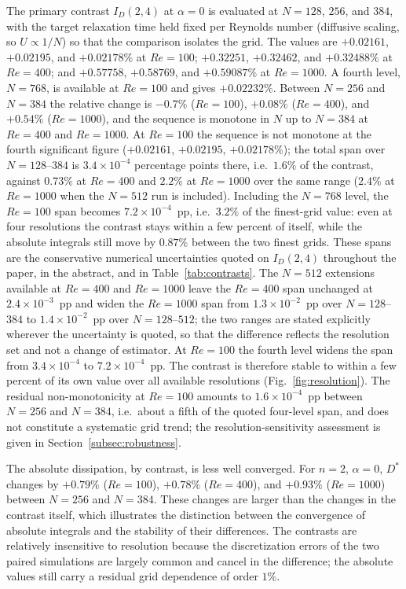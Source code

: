 The primary contrast $I_D(2,4)$ at $\alpha=0$ is evaluated at $N=128$, $256$, and $384$, with the target relaxation time held fixed per Reynolds number (diffusive scaling, so $U\propto1/N$) so that the comparison isolates the grid. The values are $+0.02161$, $+0.02195$, and $+0.02178\%$ at $Re=100$; $+0.32251$, $+0.32462$, and $+0.32488\%$ at $Re=400$; and $+0.57758$, $+0.58769$, and $+0.59087\%$ at $Re=1000$. A fourth level, $N=768$, is available at $Re=100$ and gives $+0.02232\%$. Between $N=256$ and $N=384$ the relative change is $-0.7\%$ ($Re=100$), $+0.08\%$ ($Re=400$), and $+0.54\%$ ($Re=1000$), and the sequence is monotone in $N$ up to $N=384$ at $Re=400$ and $Re=1000$. At $Re=100$ the sequence is not monotone at the fourth significant figure ($+0.02161$, $+0.02195$, $+0.02178\%$); the total span over $N=128$--$384$ is $3.4\times10^{-4}$ percentage points there, i.e.\ $1.6\%$ of the contrast, against $0.73\%$ at $Re=400$ and $2.2\%$ at $Re=1000$ over the same range ($2.4\%$ at $Re=1000$ when the $N=512$ run is included). Including the $N=768$ level, the $Re=100$ span becomes $7.2\times10^{-4}$~pp, i.e.\ $3.2\%$ of the finest-grid value: even at four resolutions the contrast stays within a few percent of itself, while the absolute integrals still move by $0.87\%$ between the two finest grids. These spans are the conservative numerical uncertainties quoted on $I_D(2,4)$ throughout the paper, in the abstract, and in Table~\ref{tab:contrasts}. The $N=512$ extensions available at $Re=400$ and $Re=1000$ leave the $Re=400$ span unchanged at $2.4\times10^{-3}$~pp and widen the $Re=1000$ span from $1.3\times10^{-2}$~pp over $N=128$--$384$ to $1.4\times10^{-2}$~pp over $N=128$--$512$; the two ranges are stated explicitly wherever the uncertainty is quoted, so that the difference reflects the resolution set and not a change of estimator. At $Re=100$ the fourth level widens the span from $3.4\times10^{-4}$ to $7.2\times10^{-4}$~pp. The contrast is therefore stable to within a few percent of its own value over all available resolutions (Fig.~\ref{fig:resolution}). The residual non-monotonicity at $Re=100$ amounts to $1.6\times10^{-4}$~pp between $N=256$ and $N=384$, i.e.\ about a fifth of the quoted four-level span, and does not constitute a systematic grid trend; the resolution-sensitivity assessment is given in Section~\ref{subsec:robustness}.

The absolute dissipation, by contrast, is less well converged. For $n=2$, $\alpha=0$, $D^*$ changes by $+0.79\%$ ($Re=100$), $+0.78\%$ ($Re=400$), and $+0.93\%$ ($Re=1000$) between $N=256$ and $N=384$. These changes are larger than the changes in the contrast itself, which illustrates the distinction between the convergence of absolute integrals and the stability of their differences. The contrasts are relatively insensitive to resolution because the discretization errors of the two paired simulations are largely common and cancel in the difference; the absolute values still carry a residual grid dependence of order $1\%$.

